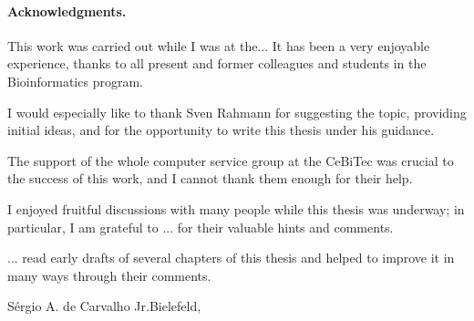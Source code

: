 \paragraph{Acknowledgments.}
This work was carried out while I was at the...
It has been a very enjoyable experience, thanks to all present and
former colleagues and students in the Bioinformatics program.

I would especially like to thank Sven Rahmann for suggesting the
topic, providing initial ideas, and for the opportunity to write this
thesis under his guidance.

The support of the whole computer service group at the CeBiTec was
crucial to the success of this work, and I cannot thank them enough
for their help.

I enjoyed fruitful discussions with many people while this thesis was
underway; in particular, I am grateful to ...
for their valuable hints and comments. 

... read early drafts of several chapters of this thesis and
helped to improve it in many ways through their comments.


\vspace*{6ex}
S\'ergio A. de Carvalho Jr.\hfill Bielefeld, \handindate
